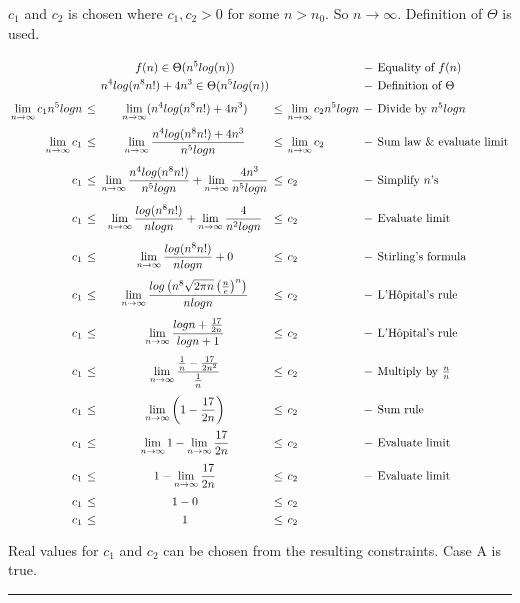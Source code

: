 \documentclass{article}
\begin{document}
$c_{1}$ and $c_{2}$ is chosen where $c_{1}, c_{2} > 0$ for some $n > n_{0}$. So $n \to \infty$. Definition of $\Theta$ is used. 
\[\setlength\arraycolsep{2pt}\def\arraystretch{2}
    \begin{array}{rccclcl}
&& \displaystyle f(n) \in \Theta(n^{5}log(n)) && &-& \text{Equality of $f(n)$} \\ [-2ex]
&& \displaystyle n^{4}log(n^{8}n!) + 4n^{3} \in \Theta(n^{5}log(n)) && &-& \text{Definition of $\Theta$} \\ [-1ex]
\displaystyle \lim _{n \to \infty } c_{1}n^{5}log n &\le& \displaystyle \lim _{n \to \infty } (n^{4}log(n^{8}n!) + 4n^{3}) &\le& \displaystyle\lim _{n \to \infty } c_{2}n^{5}log n &-& \text{Divide by $n^{5}log n$} \\ [1ex]
\displaystyle \lim _{n \to \infty } c_{1} &\le& \displaystyle \lim _{n \to \infty }\frac{n^{4}log(n^{8}n!) + 4n^{3}} {n^{5}log n} &\le& \displaystyle \lim _{n \to \infty } c_{2} &-& \text{Sum law \& evaluate limit} \\ [2ex]
\displaystyle c_{1} &\le& \displaystyle \lim _{n \to \infty }\frac{n^{4}log(n^{8}n!)} {n^{5}log n} + \lim _{n \to \infty }\frac{4n^{3}} {n^{5}log n} &\le& c_{2} &-& \text{Simplify $n$'s} \\ [2ex]
\displaystyle c_{1} &\le& \displaystyle \lim _{n \to \infty }\frac{log(n^{8}n!)} {n log n} + \lim _{n \to \infty }\frac{4} {n^{2}log n} &\le& c_{2} &-& \text{Evaluate limit} \\ [2ex]
\displaystyle c_{1} &\le& \displaystyle \lim _{n \to \infty }\frac{log(n^{8}n!)} {n log n} + 0 &\le& c_{2} &-& \text{Stirling's formula}\\ [2ex]
\displaystyle c_{1} &\le& \displaystyle \lim _{n \to \infty }\frac{log\left( n^{8}\sqrt{2\pi n}\left(\frac{n}{e}\right)^{n}\right)} {n log n} &\le& c_{2} &-& \text{L'Hôpital's rule} \\ [2ex]
\displaystyle c_{1} &\le& \displaystyle \lim _{n \to \infty }\frac{log n + \frac{17}{2n}} {log n + 1} &\le& c_{2} &-& \text{L'Hôpital's rule} \\ [2ex]
\displaystyle c_{1} &\le& \displaystyle \lim _{n \to \infty } \frac{\frac{1}{n} - \frac{17}{2n^{2}}} {\frac{1}{n}} &\le& c_{2} &-& \text{Multiply by $\frac{n}{n}$} \\ [2ex]
\displaystyle c_{1} &\le& \displaystyle \lim _{n \to \infty } \left(1 - \frac{17}{2n}\right) &\le& c_{2} &-& \text{Sum rule} \\ [1ex]
\displaystyle c_{1} &\le& \displaystyle \lim _{n \to \infty } 1 - \displaystyle \lim _{n \to \infty } \frac{17}{2n} &\le& c_{2} &-& \text{Evaluate limit} \\ [1ex]
\displaystyle c_{1} &\le& 1 - \displaystyle \lim _{n \to \infty } \displaystyle \frac{17}{2n} &\le& c_{2} &-& \text{Evaluate limit} \\ [-0.5ex]
\displaystyle c_{1} &\le& 1 - 0 &\le& c_{2} && \text{} \\ [-2ex]
\displaystyle c_{1} &\le& 1 &\le& c_{2} && \text{} 
    \end{array}
\] 
Real values for $c_{1}$  and $c_{2}$ can be chosen from the resulting constraints. Case A is true. 
\par\noindent\rule{\textwidth}{0.7pt}
\end{document}
